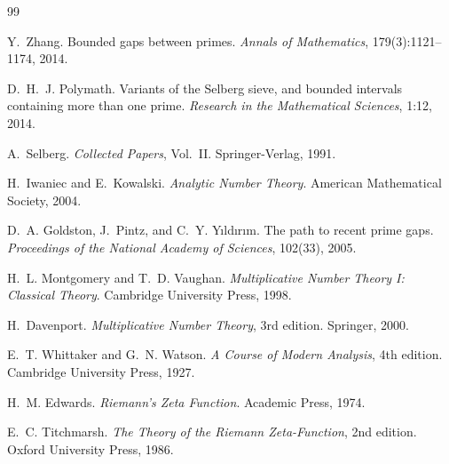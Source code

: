 \documentclass[11pt,a4paper]{article}
\theoremstyle{remark}
\begin{document}

\begin{thebibliography}{99}

Y.~Zhang.
\newblock Bounded gaps between primes.
\newblock \emph{Annals of Mathematics}, 179(3):1121--1174, 2014.

D.~H.~J. Polymath.
\newblock Variants of the Selberg sieve, and bounded intervals containing more than one prime.
\newblock \emph{Research in the Mathematical Sciences}, 1:12, 2014.

A.~Selberg.
\newblock \emph{Collected Papers}, Vol.~II.
\newblock Springer-Verlag, 1991.

H.~Iwaniec and E.~Kowalski.
\newblock \emph{Analytic Number Theory}.
\newblock American Mathematical Society, 2004.

D.~A. Goldston, J.~Pintz, and C.~Y. Y{\i}ld{\i}r{\i}m.
\newblock The path to recent prime gaps.
\newblock \emph{Proceedings of the National Academy of Sciences}, 102(33), 2005.

H.~L. Montgomery and T.~D. Vaughan.
\newblock \emph{Multiplicative Number Theory I: Classical Theory}.
\newblock Cambridge University Press, 1998.

H.~Davenport.
\newblock \emph{Multiplicative Number Theory}, 3rd edition.
\newblock Springer, 2000.

E.~T. Whittaker and G.~N. Watson.
\newblock \emph{A Course of Modern Analysis}, 4th edition.
\newblock Cambridge University Press, 1927.

H.~M. Edwards.
\newblock \emph{Riemann's Zeta Function}.
\newblock Academic Press, 1974.

E.~C. Titchmarsh.
\newblock \emph{The Theory of the Riemann Zeta-Function}, 2nd edition.
\newblock Oxford University Press, 1986.

\end{thebibliography}
\end{document}

